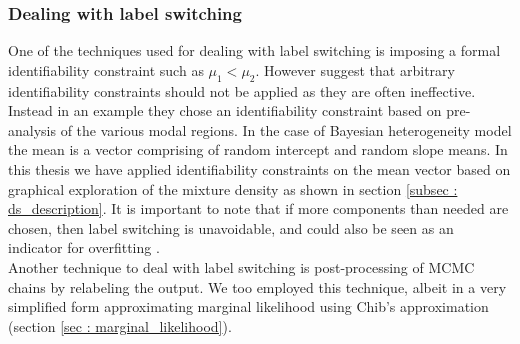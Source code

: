\subsubsection{Dealing with label switching}
One of the techniques used for dealing with label switching is imposing a formal identifiability constraint such as $\mu_1 < \mu_2$. However \citet{fruhwirth-schnatter_bayesian_2004} suggest that arbitrary identifiability constraints should not be applied as they are often ineffective. Instead in an example they chose an identifiability constraint based on pre-analysis of the various modal regions. In the case of Bayesian heterogeneity model the mean is a vector comprising of random intercept and random slope means. In this thesis we have applied identifiability constraints on the mean vector based on graphical exploration of the mixture density as shown in section \ref{subsec : ds_description}. It is important to note that if more components than needed are chosen, then label switching is unavoidable, and could also be seen as an indicator for overfitting \citep[pg. 104]{fruhwirth-schnatter_finite_2013}.\\

Another technique to deal with label switching is post-processing of MCMC chains by relabeling the output\citep{richardson_bayesian_1997,stephens_dealing_2000}. We too employed this technique, albeit in a very simplified form approximating marginal likelihood using Chib's approximation (section \ref{sec : marginal_likelihood}).